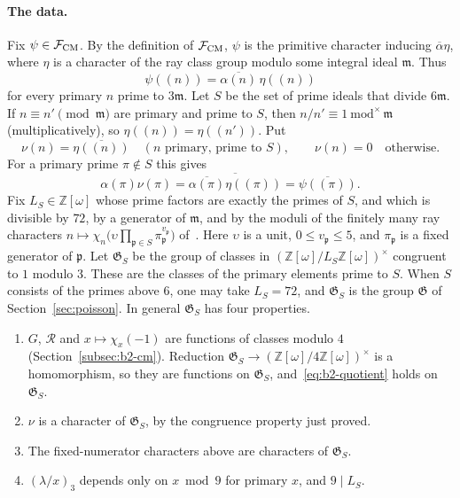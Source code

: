 \documentclass[11pt]{article}
\numberwithin{equation}{section}
\newcommand{\OO}{\mathbb Z[\omega]}
\begin{document}
\paragraph{The data.} Fix $\psi\in\mathcal F_{\rm CM}$. By the definition of $\mathcal F_{\rm CM}$, $\psi$ is
the primitive character inducing $\overline\alpha\eta$, where $\eta$ is a character of the ray class group
modulo some integral ideal $\mathfrak m$. Thus
\begin{equation}\label{eq:d191}
 \psi((n))=\overline{\alpha(n)}\,\eta((n))
\end{equation}
for every primary $n$ prime to $3\mathfrak m$. Let $S$ be the set of prime ideals that divide $6\mathfrak m$.
If $n\equiv n'\pmod{\mathfrak m}$ are primary and prime to $S$, then $n/n'\equiv1\ \mathrm{mod}^\times\,\mathfrak m$
(multiplicatively), so $\eta((n))=\eta((n'))$. Put
\begin{equation}\label{eq:d192}
 \nu(n)=\overline{\eta((n))}\quad(n\text{ primary, prime to }S),\qquad\nu(n)=0\quad\text{otherwise}.
\end{equation}
For a primary prime $\pi\notin S$ this gives
\begin{equation}\label{eq:s6-euler}
 \alpha(\pi)\nu(\pi)=\overline{\overline{\alpha(\pi)}\eta((\pi))}=\overline{\psi((\pi))}.
\end{equation}
Fix $L_S\in\OO$ whose prime factors are exactly the primes of $S$, and which is divisible by $72$, by a
generator of $\mathfrak m$, and by the moduli of the finitely many ray characters
$n\mapsto\chi_n\bigl(\upsilon\prod_{\mathfrak p\in S}\pi_{\mathfrak p}^{v_{\mathfrak p}}\bigr)$
of~\cite[Lemma~4.1]{OAI78}. Here $\upsilon$ is a unit, $0\le v_{\mathfrak p}\le5$, and
$\pi_{\mathfrak p}$ is a fixed generator of $\mathfrak p$. Let $\mathfrak G_S$ be the group of classes in
$(\OO/L_S\OO)^\times$ congruent to $1$ modulo $3$. These are the classes of the primary elements prime to $S$.
When $S$ consists of the primes above $6$, one may take $L_S=72$, and $\mathfrak G_S$ is the group
$\mathfrak G$ of Section~\ref{sec:poisson}. In general $\mathfrak G_S$ has four properties.
\begin{enumerate}
\item[(G1)] $G$, $\mathcal R$ and $x\mapsto\chi_x(-1)$ are functions of classes modulo $4$
 (Section~\ref{subsec:b2-cm}). Reduction $\mathfrak G_S\to(\OO/4\OO)^\times$ is a homomorphism, so they are
 functions on $\mathfrak G_S$, and~\eqref{eq:b2-quotient} holds on $\mathfrak G_S$.
\item[(G2)] $\nu$ is a character of $\mathfrak G_S$, by the congruence property just proved.
\item[(G3)] The fixed-numerator characters above are characters of $\mathfrak G_S$.
\item[(G4)] $(\lambda/x)_3$ depends only on $x\bmod9$ for primary $x$, and $9\mid L_S$.
\end{enumerate}
\end{document}
